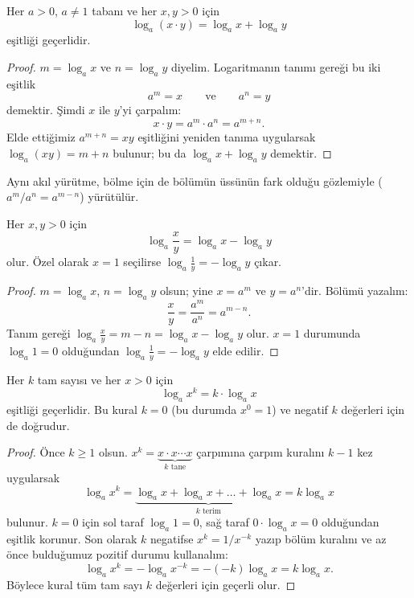 \begin{theorem}\label{thm:log-carpim}
Her $a > 0$, $a \neq 1$ tabanı ve her $x, y > 0$ için
\[
\log_a (x \cdot y) = \log_a x + \log_a y
\]
eşitliği geçerlidir.
\end{theorem}

\begin{proof}
$m = \log_a x$ ve $n = \log_a y$ diyelim. Logaritmanın tanımı gereği bu iki eşitlik
\[
a^m = x \qquad \text{ve} \qquad a^n = y
\]
demektir. Şimdi $x$ ile $y$'yi çarpalım:
\[
x \cdot y = a^m \cdot a^n = a^{m+n}.
\]
Elde ettiğimiz $a^{m+n} = xy$ eşitliğini yeniden tanıma uygularsak $\log_a (xy) = m + n$ bulunur; bu da $\log_a x + \log_a y$ demektir.
\end{proof}

Aynı akıl yürütme, bölme için de bölümün üssünün fark olduğu gözlemiyle ($a^m / a^n = a^{m-n}$) yürütülür.

\begin{corollary}\label{cor:log-bolum}
Her $x, y > 0$ için
\[
\log_a \frac{x}{y} = \log_a x - \log_a y
\]
olur. Özel olarak $x = 1$ seçilirse $\log_a \frac{1}{y} = -\log_a y$ çıkar.
\end{corollary}

\begin{proof}
$m = \log_a x$, $n = \log_a y$ olsun; yine $x = a^m$ ve $y = a^n$'dir. Bölümü yazalım:
\[
\frac{x}{y} = \frac{a^m}{a^n} = a^{m-n}.
\]
Tanım gereği $\log_a \frac{x}{y} = m - n = \log_a x - \log_a y$ olur. $x = 1$ durumunda $\log_a 1 = 0$ olduğundan $\log_a \frac{1}{y} = -\log_a y$ elde edilir.
\end{proof}

\begin{theorem}\label{thm:log-kuvvet}
Her $k$ tam sayısı ve her $x > 0$ için
\[
\log_a x^k = k \cdot \log_a x
\]
eşitliği geçerlidir. Bu kural $k = 0$ (bu durumda $x^0 = 1$) ve negatif $k$ değerleri için de doğrudur.
\end{theorem}

\begin{proof}
Önce $k \ge 1$ olsun. $x^k = \underbrace{x \cdot x \cdots x}_{k \text{ tane}}$ çarpımına çarpım kuralını $k-1$ kez uygularsak
\[
\log_a x^k = \underbrace{\log_a x + \log_a x + \dots + \log_a x}_{k \text{ terim}} = k \log_a x
\]
bulunur. $k = 0$ için sol taraf $\log_a 1 = 0$, sağ taraf $0 \cdot \log_a x = 0$ olduğundan eşitlik korunur. Son olarak $k$ negatifse $x^k = 1/x^{-k}$ yazıp bölüm kuralını ve az önce bulduğumuz pozitif durumu kullanalım:
\[
\log_a x^k = -\log_a x^{-k} = -(-k)\log_a x = k \log_a x.
\]
Böylece kural tüm tam sayı $k$ değerleri için geçerli olur.
\end{proof}

